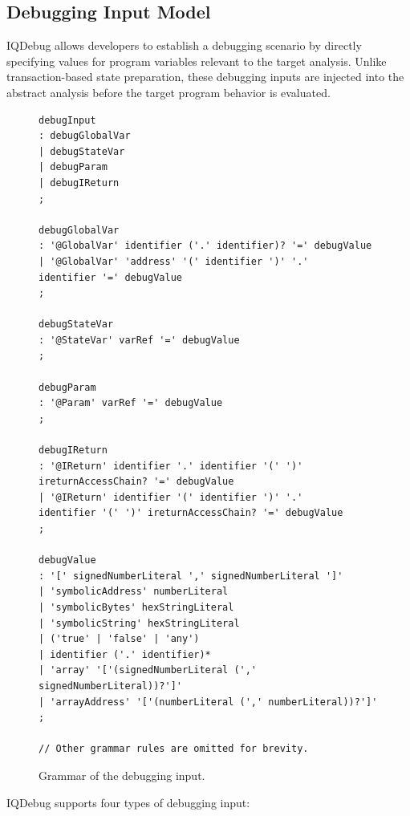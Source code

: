 \documentclass[11pt,oneside]{report}
\theoremstyle{plain}
\theoremstyle{definition}
\theoremstyle{remark}
\begin{document}
\subsection{Debugging Input Model}\label{subsec:design:inputs}
IQDebug allows developers to establish a debugging scenario by directly specifying values for program variables relevant to the target analysis.
Unlike transaction-based state preparation, these debugging inputs are injected into the abstract analysis before the target program behavior is evaluated.

\begin{figure}[!t]
\footnotesize
{}
\begin{verbatim}
debugInput
: debugGlobalVar
| debugStateVar
| debugParam
| debugIReturn
;

debugGlobalVar
: '@GlobalVar' identifier ('.' identifier)? '=' debugValue
| '@GlobalVar' 'address' '(' identifier ')' '.'
identifier '=' debugValue
;

debugStateVar
: '@StateVar' varRef '=' debugValue
;

debugParam
: '@Param' varRef '=' debugValue
;

debugIReturn
: '@IReturn' identifier '.' identifier '(' ')'
ireturnAccessChain? '=' debugValue
| '@IReturn' identifier '(' identifier ')' '.'
identifier '(' ')' ireturnAccessChain? '=' debugValue
;

debugValue
: '[' signedNumberLiteral ',' signedNumberLiteral ']'
| 'symbolicAddress' numberLiteral
| 'symbolicBytes' hexStringLiteral
| 'symbolicString' hexStringLiteral
| ('true' | 'false' | 'any')
| identifier ('.' identifier)*
| 'array' '['(signedNumberLiteral (',' signedNumberLiteral))?']'
| 'arrayAddress' '['(numberLiteral (',' numberLiteral))?']'
;

// Other grammar rules are omitted for brevity.
\end{verbatim}
\caption{Grammar of the debugging input.}
\label{fig:design:debug-input-grammar}
\end{figure}

IQDebug supports four types of debugging input:
\end{document}

